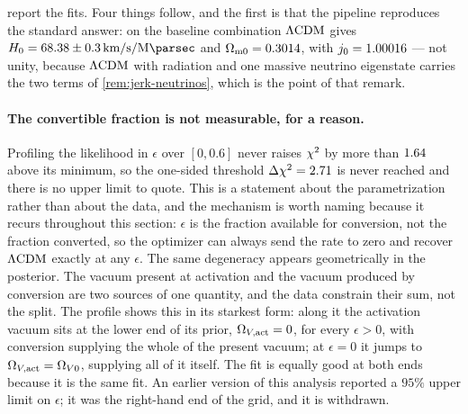  report the fits. Four things follow, and
the first is that the pipeline reproduces the standard answer: on the baseline
combination $\Lambda\mathrm{CDM}$ gives $\Hz=\numChainsLcdmBaselineDerivedHZ\pm
\numChainsLcdmBaselineDerivedHZErrHi\,\si{\kilo\metre\per\second\per\mega\parsec}$
and $\Omega_{\rm m0}=0.3014$, with
$j_0=1.00016$ --- not unity, because $\Lambda\mathrm{CDM}$ with
radiation and one massive neutrino eigenstate carries the two terms of
\cref{rem:jerk-neutrinos}, which is the point of that remark.

\paragraph{The convertible fraction is not measurable, for a reason.}
Profiling the likelihood in $\epsilon$ over $[0,0.6]$ never raises $\chi^{2}$ by
more than $1.64$ above its minimum, so the
one-sided threshold $\Delta\chi^{2}=2.71$ is never reached and there is no upper
limit to quote. This is a statement about the parametrization rather than about
the data, and the mechanism is worth naming because it recurs throughout this
section: $\epsilon$ is the fraction available for conversion, not the fraction
converted, so the optimizer can always send the rate to zero and recover
$\Lambda\mathrm{CDM}$ exactly at any $\epsilon$. The same degeneracy appears geometrically in
the posterior. The vacuum present at activation and the vacuum produced by
conversion are two sources of one quantity, and the data constrain their sum,
not the split. The profile shows this in its starkest form: along it the
activation vacuum sits at the lower end of its prior, $\Omega_{V,\rm act}=0$,
for every $\epsilon>0$, with conversion supplying the whole of the present
vacuum; at $\epsilon=0$ it jumps to $\Omega_{V,\rm act}=\Omega_{V0}$, supplying
all of it itself. The fit is equally good at both ends because it is the same
fit. An earlier version of this analysis
reported a $95\%$ upper limit on $\epsilon$; it was the right-hand end of the
grid, and it is withdrawn.

